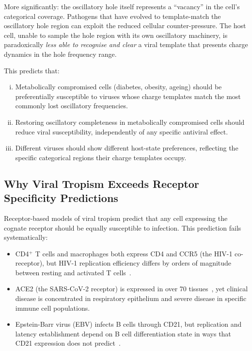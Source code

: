 \documentclass[12pt,a4paper]{article}
\theoremstyle{definition}
\theoremstyle{remark}
\begin{document}
More significantly: the oscillatory hole itself represents a ``vacancy'' in the cell's categorical coverage. Pathogens that have evolved to template-match the oscillatory hole region can exploit the reduced cellular counter-pressure. The host cell, unable to sample the hole region with its own oscillatory machinery, is paradoxically \emph{less able to recognise and clear} a viral template that presents charge dynamics in the hole frequency range.

This predicts that:
\begin{enumerate}[(i)]
  \item Metabolically compromised cells (diabetes, obesity, ageing) should be preferentially susceptible to viruses whose charge templates match the most commonly lost oscillatory frequencies.
  \item Restoring oscillatory completeness in metabolically compromised cells should reduce viral susceptibility, independently of any specific antiviral effect.
  \item Different viruses should show different host-state preferences, reflecting the specific categorical regions their charge templates occupy.
\end{enumerate}

\subsection{Why Viral Tropism Exceeds Receptor Specificity Predictions}

Receptor-based models of viral tropism predict that any cell expressing the cognate receptor should be equally susceptible to infection. This prediction fails systematically:

\begin{itemize}
  \item CD4$^+$ T cells and macrophages both express CD4 and CCR5 (the HIV-1 co-receptor), but HIV-1 replication efficiency differs by orders of magnitude between resting and activated T cells~\cite{Bukrinsky1991,Zack1990}.
  \item ACE2 (the SARS-CoV-2 receptor) is expressed in over 70 tissues~\cite{Zou2020}, yet clinical disease is concentrated in respiratory epithelium and severe disease in specific immune cell populations.
  \item Epstein-Barr virus (EBV) infects B cells through CD21, but replication and latency establishment depend on B cell differentiation state in ways that CD21 expression does not predict~\cite{Young1994}.
\end{itemize}
\end{document}
